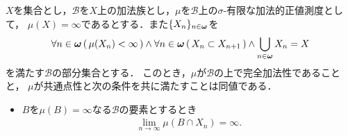 		\begin{prf}
			
		\end{prf}
		
		\begin{screen}
			\begin{thm}
			\label{thm:equivalent_conditions_of_countable_additivity_for_sigma_finite_measures}
				$X$を集合とし，$\mathcal{B}$を$X$上の加法族とし，$\mu$を$\mathcal{B}$上の$\sigma$-有限な加法的正値測度として，
				$\mu(X) = \infty$であるとする．また$\{X_n\}_{n \in {\boldsymbol \omega}}$を
				\begin{align}
					\forall n \in {\boldsymbol \omega}\, (\, \mu(X_n) < \infty\, ) \wedge
					\forall n \in {\boldsymbol \omega}\, (\, X_n \subset X_{n+1}\, ) \wedge
					\bigcup_{n \in {\boldsymbol \omega}} X_n = X
				\end{align}
				を満たす$\mathcal{B}$の部分集合とする．
				このとき，$\mu$が$\mathcal{B}$の上で完全加法性であることと，
				$\mu$が共通点性と次の条件を共に満たすことは同値である．
				\begin{itemize}
					\item $B$を$\mu(B) = \infty$なる$\mathcal{B}$の要素とするとき
						\begin{align}
							\lim_{n \to \infty} \mu(B \cap X_n) = \infty.
						\end{align}
				\end{itemize}
			\end{thm}
		\end{screen}
		
		\begin{prf}
			
		\end{prf}